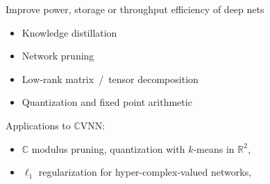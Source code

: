 \documentclass{beamer}
\newcommand{\real}{\mathbb{R}}
\newcommand{\cplx}{\mathbb{C}}
\begin{document}
\begin{frame}[c]{\insertsection}
  Improve power, storage or throughput efficiency of deep nets
  \begin{itemize}
    \pause
    \item Knowledge distillation
      {\tiny \\ \quad
        \citep{hinton_distilling_2015,balasubramanian_deep_2016}}

    \smallskip
    \item Network pruning
      {\tiny \\ \quad
        \citep{lecun_optimal_1990,seide_conversational_2011,zhu_prune_2018}}

    \pause
    \smallskip
    \item Low-rank matrix~/~tensor decomposition
      {\tiny \\ \quad
        \citep{denton_exploiting_2014,novikov_tensorizing_2015}}

    \smallskip
    \item Quantization and fixed point arithmetic
      {\tiny \\ \quad
        \citep{courbariaux_training_2015,han_deep_2016,chen_fxpnet_2017}}
  \end{itemize}

  \pause
  \bigskip
  Applications to $\cplx$VNN:
  \begin{itemize}
    \item $\cplx$ modulus pruning, quantization with $k$-means in $
        \real^2%
      $, 
      {\tiny \\ \quad
        \citep{wu_compressing_2019}}

    \smallskip
    \item $\ell_1$ regularization for hyper-complex-valued networks,
      {\tiny \\ \quad
        \citep{vecchi_compressing_2020}}
  \end{itemize}

\end{frame}
\end{document}
